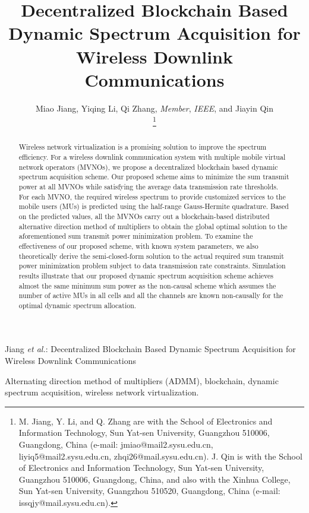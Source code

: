 \documentclass[journal]{IEEEtran}
\begin{document}
	
\title{Decentralized Blockchain Based Dynamic Spectrum Acquisition for Wireless Downlink Communications}
	
\author{Miao Jiang, Yiqing Li, Qi Zhang, \emph{Member}, \emph{IEEE}, and Jiayin Qin

\thanks{M. Jiang, Y. Li, and Q. Zhang are with the School of Electronics and Information Technology, Sun Yat-sen University, Guangzhou 510006, Guangdong, China (e-mail: jmiao@mail2.sysu.edu.cn, liyiq5@mail2.sysu.edu.cn, zhqi26@mail.sysu.edu.cn). J. Qin is with the School of Electronics and
Information Technology, Sun Yat-sen University, Guangzhou 510006, Guangdong,  China, and also with the Xinhua College, Sun Yat-sen University, Guangzhou 510520, Guangdong, China (e-mail: issqjy@mail.sysu.edu.cn).}
}%
	
	
\markboth{}
{Jiang \MakeLowercase{\textit{et al.}}: Decentralized Blockchain Based Dynamic Spectrum Acquisition for Wireless Downlink Communications}
	
\maketitle
\begin{abstract}
Wireless network virtualization is a promising solution to improve the spectrum efficiency. For a wireless downlink communication system with multiple mobile virtual network operators (MVNOs), we propose a decentralized blockchain based dynamic spectrum acquisition scheme. Our proposed scheme aims to minimize the sum transmit power at all MVNOs while satisfying the average data transmission rate thresholds. For each MVNO,
the required wireless spectrum to provide customized services to the mobile users (MUs) is predicted using the half-range Gauss-Hermite quadrature. Based on the predicted values, all the MVNOs carry out a blockchain-based distributed alternative direction method of multipliers to obtain the global optimal solution to the aforementioned sum transmit power minimization problem. To examine the effectiveness of our proposed scheme, with known system parameters, we also theoretically derive the semi-closed-form solution to the actual required sum transmit power minimization problem subject to data transmission rate constraints. Simulation results illustrate that our proposed dynamic spectrum acquisition scheme achieves almost the same minimum sum power as the non-causal scheme which assumes the number of active MUs in all cells and all the channels are known non-causally for the optimal dynamic spectrum allocation.
\end{abstract}
\begin{IEEEkeywords}
Alternating direction method of multipliers (ADMM), blockchain, dynamic spectrum acquisition, wireless network virtualization.
\end{IEEEkeywords}
\IEEEpeerreviewmaketitle
	
\end{document}
